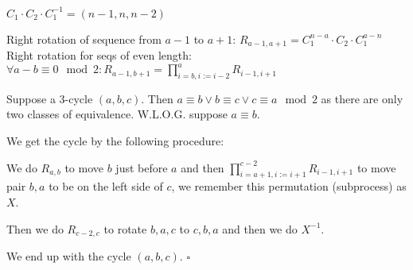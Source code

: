 \documentclass[11pt]{article}
\begin{document}
    $C_1 \cdot C_2 \cdot C_1^{-1} = (n-1, n, n-2)$

    Right rotation of sequence from $a-1$ to $a+1$: $R_{a-1,a+1} = C_1^{n-a} \cdot C_2 \cdot C_1^{a-n}$ \\
    Right rotation for seqs of even length: $\forall a-b \equiv 0 \mod 2: R_{a-1, b+1} = \prod\limits_{i = b, i:=i-2}^a R_{i-1,i+1}$

    Suppose a 3-cycle $(a, b, c)$. Then $a \equiv b \vee b \equiv c \vee c \equiv a \mod 2$ as there are only two classes of equivalence. W.L.O.G. suppose $a \equiv b$.

    We get the cycle by the following procedure:

    We do $R_{a,b}$ to move $b$ just before $a$ and then $\prod\limits_{i=a+1,i:=i+1}^{c-2} R_{i-1,i+1}$ to move pair $b,a$ to be on the left side of $c$, we remember this permutation (subprocess) as $X$.

    Then we do $R_{c-2,c}$ to rotate $b,a,c$ to $c,b,a$ and then we do $X^{-1}$.

    We end up with the cycle $(a,b,c)$. $\square$
\end{document}
